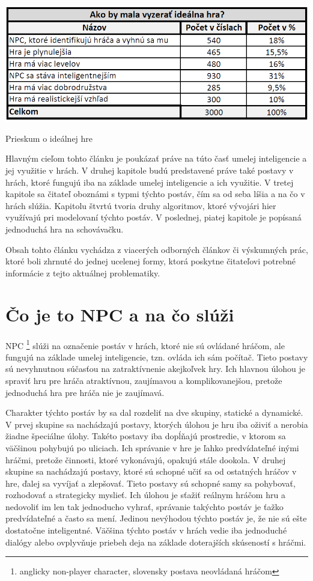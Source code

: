 \documentclass[10pt,twoside,slovak,a4paper]{article}
\begin{document}
\begin{table}[tbh]
\center \includegraphics[scale=0.5]{prieskum.png}
\caption{Prieskum o ideálnej hre}
\label{t:t1}
\end{table}

Hlavným cieľom tohto článku je poukázať práve na túto časť umelej inteligencie a jej využitie v hrách. V druhej kapitole budú predstavené práve také postavy v hrách, ktoré fungujú iba na základe umelej inteligencie a ich využitie. V tretej kapitole sa čitateľ oboznámi s typmi týchto postáv, čím sa od seba líšia a na čo v hrách slúžia. Kapitolu štvrtú tvoria druhy algoritmov, ktoré vývojári hier využívajú pri modelovaní týchto postáv. V poslednej, piatej kapitole je popísaná jednoduchá hra na schovávačku.

Obsah tohto článku vychádza z viacerých odborných článkov či výskumných prác, ktoré boli zhrnuté do jednej ucelenej formy, ktorá poskytne čitateľovi potrebné informácie z tejto aktuálnej problematiky. 


\section{Čo je to NPC a na čo slúži}  \label{nejaka}
\quad NPC \footnote{anglicky non-player character, slovensky postava neovládaná hráčom} slúži na označenie postáv v hrách, ktoré nie sú ovládané hráčom, ale fungujú na základe umelej inteligencie, tzn. ovláda ich sám počítač. Tieto postavy sú nevyhnutnou súčasťou na zatraktívnenie akejkoľvek hry. Ich hlavnou úlohou je spraviť hru pre hráča atraktívnou, zaujímavou a komplikovanejšou, pretože jednoduchá hra pre hráča nie je zaujímavá. 

\quad Charakter týchto postáv by sa dal rozdeliť na dve skupiny, statické a dynamické. V prvej skupine sa nachádzajú postavy, ktorých úlohou je hru iba oživiť a nerobia žiadne špeciálne úlohy. Takéto postavy iba dopĺňajú prostredie, v ktorom sa väčšinou pohybujú po uliciach. Ich správanie v hre je ľahko predvídateľné inými hráčmi, pretože činnosti, ktoré vykonávajú, opakujú stále dookola. V druhej skupine sa nachádzajú postavy, ktoré sú schopné učiť sa od ostatných hráčov v hre, ďalej sa vyvíjať a zlepšovať. Tieto postavy sú schopné samy sa pohybovať, rozhodovať a strategicky myslieť. Ich úlohou je sťažiť reálnym hráčom hru a nedovoliť im len tak jednoducho vyhrať, správanie takýchto postáv je ťažko predvídateľné a často sa mení. Jedinou nevýhodou týchto postáv je, že nie sú ešte dostatočne inteligentné. Väčšina týchto postáv v hrách vedie iba jednoduché dialógy alebo ovplyvňuje priebeh deja na základe doterajších skúseností s hráčmi. 
\end{document}
